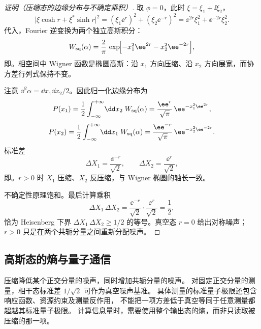 \begin{proof}[证明（压缩态的边缘分布与不确定乘积）]
取 \(\phi=0\)，此时 \(\xi=\xi_1+\ii\xi_2\)，
\begin{equation*}
\bigl|\xi\cosh r+\xi^*\sinh r\bigr|^2
=(\xi_1\ee^r)^2+(\xi_2\ee^{-r})^2
=\ee^{2r}\xi_1^2+\ee^{-2r}\xi_2^2.
\end{equation*}
代入，Fourier 逆变换为两个独立高斯积分：
\begin{equation}
W_{\rm sq}(\alpha)
=\frac{2}{\pi}\,\exp\!\Bigl[-x_1^2\ee^{2r}-x_2^2\ee^{-2r}\Bigr],
\label{eq:squeezed-wigner-function}
\end{equation}
即。相空间中 Wigner 函数是椭圆高斯：沿 \(x_1\) 方向压缩、沿 \(x_2\) 方向展宽，而协方差行列式保持不变。

注意 \(\dd^2\alpha=\dd x_1\dd x_2/2\)。因此归一化边缘分布为
\begin{equation*}
P(x_1)=\frac12\int_{-\infty}^{+\infty}\!\dd x_2\;W_{\rm sq}(\alpha)
=\frac{\ee^r}{\sqrt\pi}\,\ee^{-x_1^2\ee^{2r}},
\end{equation*}
\begin{equation*}
P(x_2)=\frac12\int_{-\infty}^{+\infty}\!\dd x_1\;W_{\rm sq}(\alpha)
=\frac{\ee^{-r}}{\sqrt\pi}\,\ee^{-x_2^2\ee^{-2r}}.
\end{equation*}
标准差
\begin{equation}
\Delta X_1=\frac{\ee^{-r}}{\sqrt2},
\qquad
\Delta X_2=\frac{\ee^r}{\sqrt2},
\label{eq:squeezed-quadrature-variance}
\end{equation}
即。\(r>0\) 时 \(X_1\) 压缩、\(X_2\) 反压缩，与 Wigner 椭圆的轴长一致。

不确定性原理饱和。最后计算乘积
\begin{equation*}
\Delta X_1\,\Delta X_2
=\frac{\ee^{-r}}{\sqrt2}\cdot\frac{\ee^r}{\sqrt2}
=\frac12,
\end{equation*}
恰为 Heisenberg 下界 \(\Delta X_1\,\Delta X_2\ge1/2\) 的等号。真空态 \(r=0\) 给出对称噪声；\(r>0\) 只是在两个共轭分量之间重新分配噪声。

\end{proof}



\subsection{高斯态的熵与量子通信}

压缩降低某个正交分量的噪声，同时增加共轭分量的噪声。
对固定正交分量的测量，相干态标准差 $1/\sqrt2$ 可作为真空噪声基准。
具体测量的标准量子极限还包含响应函数、资源约束及测量反作用，
不能把一项方差低于真空等同于任意测量都超越其标准量子极限。
计算信息量时，需要使用整个输出态的熵，而非只读取被压缩的那一项。

